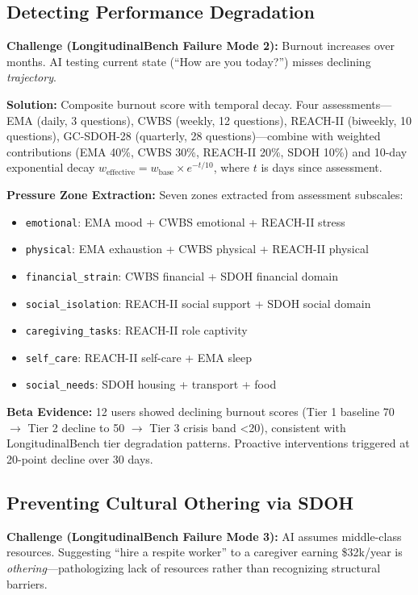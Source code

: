 \documentclass{article}%
\begin{document}
%
\subsection{Detecting Performance Degradation}%
\label{subsec:DetectingPerformanceDegradation}%
\textbf{Challenge (LongitudinalBench Failure Mode 2):} Burnout increases over months. AI testing current state (``How are you today?'') misses declining \textit{trajectory}.

\textbf{Solution:} Composite burnout score with temporal decay. Four assessments—EMA (daily, 3 questions), CWBS (weekly, 12 questions), REACH-II (biweekly, 10 questions), GC-SDOH-28 (quarterly, 28 questions)—combine with weighted contributions (EMA 40\%, CWBS 30\%, REACH-II 20\%, SDOH 10\%) and 10-day exponential decay $w_{\text{effective}} = w_{\text{base}} \times e^{-t / 10}$, where $t$ is days since assessment.

\textbf{Pressure Zone Extraction:} Seven zones extracted from assessment subscales:
\begin{itemize}
    \item \texttt{emotional}: EMA mood + CWBS emotional + REACH-II stress
    \item \texttt{physical}: EMA exhaustion + CWBS physical + REACH-II physical
    \item \texttt{financial\_strain}: CWBS financial + SDOH financial domain
    \item \texttt{social\_isolation}: REACH-II social support + SDOH social domain
    \item \texttt{caregiving\_tasks}: REACH-II role captivity
    \item \texttt{self\_care}: REACH-II self-care + EMA sleep
    \item \texttt{social\_needs}: SDOH housing + transport + food
\end{itemize}

\textbf{Beta Evidence:} 12 users showed declining burnout scores (Tier 1 baseline 70 $\rightarrow$ Tier 2 decline to 50 $\rightarrow$ Tier 3 crisis band <20), consistent with LongitudinalBench tier degradation patterns. Proactive interventions triggered at 20-point decline over 30 days.

%
\subsection{Preventing Cultural Othering via SDOH}%
\label{subsec:PreventingCulturalOtheringviaSDOH}%
\textbf{Challenge (LongitudinalBench Failure Mode 3):} AI assumes middle-class resources. Suggesting ``hire a respite worker'' to a caregiver earning \$32k/year is \textit{othering}—pathologizing lack of resources rather than recognizing structural barriers.
\end{document}
